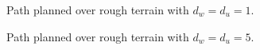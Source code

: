 				\begin{figure}
					\centering
					\caption{Path planned over rough terrain with $d_{w}=d_{u}=1$.}
					\label{fig::terrain_path_1}
				\end{figure}
				\begin{figure}
					\centering
					\caption{Path planned over rough terrain with $d_{w}=d_{u}=5$.}
					\label{fig::terrain_path_2}
				\end{figure}
